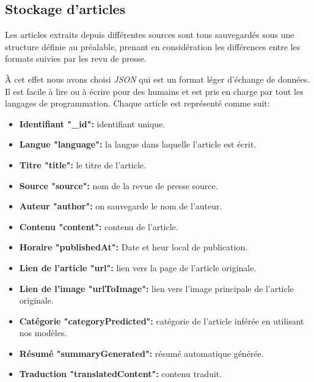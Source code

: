 \subsection{Stockage d'articles}
Les articles extraits depuis différentes sources sont tous sauvegardés sous une structure définie au préalable, prenant en considération les différences entre les formats suivies par les revu de presse. 

À cet effet nous avons choisi \emph{JSON} qui est un format léger d'échange de données. Il est facile à lire ou à écrire pour des humains\cite{json} et est pris en charge par tout les langages de programmation. 
Chaque article est représenté comme suit:
   \begin{itemize}
     \item \textbf{Identifiant "\_id": } identifiant unique.
     \item \textbf{Langue "language":} la langue dans laquelle l'article est écrit.
     \item \textbf{Titre "title":} le titre de l'article.
     \item \textbf{Source "source":} nom de la revue de presse source.
     \item \textbf{Auteur "author":} on sauvegarde le nom de l'auteur.
     \item \textbf{Contenu "content":} contenu de l'article.
     \item \textbf{Horaire "publishedAt":} Date et heur local de publication.
     \item \textbf{Lien de l'article "url":} lien vers la page de l'article originale.
     \item \textbf{Lien de l'image "urlToImage":} lien vers l'image principale de l'article originale.
     \item \textbf{Catégorie "categoryPredicted":} catégorie de l'article inférée en utilisant nos modèles.
     \item \textbf{Résumé "summaryGenerated":} résumé automatique générée.
     \item \textbf{Traduction "translatedContent":} contenu traduit.
    \end{itemize}
   
